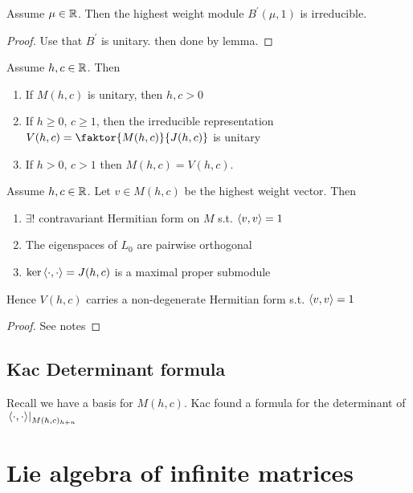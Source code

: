 \documentclass{article}
\begin{document}
\begin{prop}
Assume $\mu \in \mathbb{R}$. Then the highest weight module $B^\prime(\mu,1)$ is irreducible. 
\end{prop}
\begin{proof}
Use that $B^\prime$ is unitary. then done by lemma. 
\end{proof}

\begin{prop}
Assume $h,c \in \mathbb{R}$. Then 
\begin{enumerate}
    \item If $M(h,c)$ is unitary, then $h,c > 0$
    \item If $h \geq 0, \, c \geq 1$, then the irreducible representation $V(h,c) = \faktor{M(h,c)}{J(h,c)}$ is unitary
    \item If $h>0, \, c>1$ then $M(h,c) = V(h,c)$. 
\end{enumerate}
\end{prop}

\begin{prop}
Assume $h,c \in \mathbb{R}$. Let $v \in M(h,c)$ be the highest weight vector. Then 
\begin{enumerate}
    \item $\exists !$ contravariant Hermitian form on $M$ s.t. $\left\langle v,v \right\rangle=1$
    \item The eigenspaces of $L_0$ are pairwise orthogonal
    \item $\ker \left\langle \cdot,\cdot \right\rangle = J(h,c)$ is a maximal proper submodule
\end{enumerate}
Hence $V(h,c)$ carries a non-degenerate Hermitian form s.t. $\left\langle v,v \right\rangle=1$
\end{prop}
\begin{proof}
See notes
\end{proof}

\subsection{Kac Determinant formula}
Recall we have a basis for $M(h,c)$. Kac found a formula for the determinant of $\left. \left\langle \cdot,\cdot \right\rangle \right\rvert_{M(h,c)_{h+n}}$



\section{Lie algebra of infinite matrices}
\end{document}
